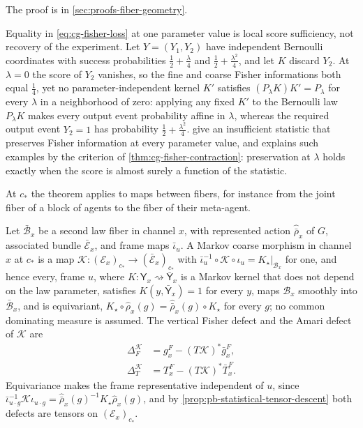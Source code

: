 The proof is in \cref{sec:proofs-fiber-geometry}.

Equality in \eqref{eq:cg-fisher-loss} at one parameter value is local score
sufficiency, not recovery of the experiment.  Let $Y=(Y_1,Y_2)$ have independent
Bernoulli coordinates with success probabilities $\tfrac12+\tfrac\lambda4$ and
$\tfrac12+\tfrac{\lambda^2}4$, and let $K$ discard $Y_2$.  At $\lambda=0$ the score of
$Y_2$ vanishes, so the fine and coarse Fisher informations both equal $\tfrac14$, yet no
parameter-independent kernel $K'$ satisfies $(P_\lambda K)K'=P_\lambda$ for every
$\lambda$ in a neighborhood of zero: applying any fixed $K'$ to the
Bernoulli law $P_\lambda K$ makes every output event probability affine in
$\lambda$, whereas the required output event $Y_2=1$ has probability
$\tfrac12+\tfrac{\lambda^2}4$.  \citet{KaganShepp2005} give an insufficient statistic that
preserves Fisher information at every parameter value, and
\citet[Theorem~7]{Pollard2013} explains such examples by the criterion of
\cref{thm:cg-fisher-contraction}: preservation at $\lambda$ holds exactly when the score
is almost surely a function of the statistic.  

At $c_*$ the theorem applies to maps between fibers, for instance from the joint fiber
of a block of agents to the fiber of their meta-agent.

Let $\bar{\mathcal B}_x$ be a second law fiber in channel $x$, with represented action
$\widehat{\bar\rho}_x$ of $G$, associated bundle $\bar{\mathcal E}_x$, and frame maps
$\bar\iota_u$.  A Markov coarse morphism in channel $x$ at $c_*$ is a map
$\mathscr K:(\mathcal E_x)_{c_*}\to(\bar{\mathcal E}_x)_{c_*}$ with
$\bar\iota_u^{-1}\circ\mathscr K\circ\iota_u=K_\star|_{\mathcal B_x}$ for one, and hence
every, frame $u$, where $K:\mathsf Y_x\rightsquigarrow\bar{\mathsf Y}_x$ is a Markov
kernel that does not depend on the law parameter, satisfies $K(y,\bar{\mathsf Y}_x)=1$
for every $y$, maps $\mathcal B_x$ smoothly into $\bar{\mathcal B}_x$, and is
equivariant, $K_\star\circ\widehat\rho_x(g)=\widehat{\bar\rho}_x(g)\circ K_\star$ for
every $g$; no common dominating measure is assumed.  The vertical Fisher defect and the
Amari defect of $\mathscr K$ are
\begin{align}
\Delta_F^{\mathscr K}
&=g^F_x-(T\mathscr K)^*\bar g^F_x,
\label{eq:pb-vertical-fisher-defect}\\
\Delta_T^{\mathscr K}
&=T^F_x-(T\mathscr K)^*\bar T^F_x.
\label{eq:pb-amari-defect}
\end{align}
Equivariance makes the frame representative independent of $u$, since
$\bar\iota_{u\cdot g}^{-1}\mathscr K\iota_{u\cdot g}
=\widehat{\bar\rho}_x(g)^{-1}K_\star\widehat\rho_x(g)$, and by
\cref{prop:pb-statistical-tensor-descent} both defects are tensors on
$(\mathcal E_x)_{c_*}$.

